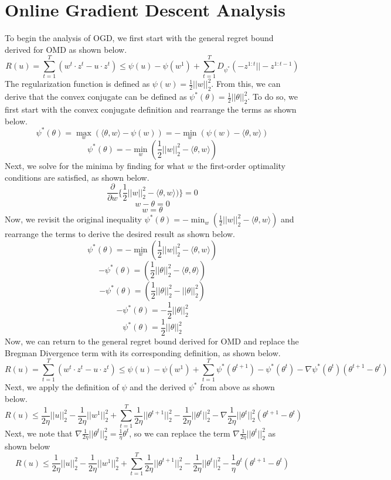 \documentclass[11pt]{article}
\begin{document}
\section{Online Gradient Descent Analysis}
To begin the analysis of OGD, we first start with the general regret bound derived for OMD as shown below.
\[ R(u) = \sum_{t=1}^T (w^t \cdot z^t - u \cdot z^t) \leq \psi(u) - \psi(w^1) + \sum_{t=1}^T D_{\psi^*}(-z^{1:t}||-z^{1:t-1}) \]
The regularization function is defined as $\psi(w) = \frac{1}{2}||w||_2^2$. From this, we can derive that the convex conjugate can be defined as $\psi^*(\theta) = \frac{1}{2}||\theta||_2^2$. To do so, we first start with the convex conjugate definition and rearrange the terms as shown below.
\[ \psi^*(\theta) = \max_w (\langle \theta, w \rangle - \psi(w)) = -\min_w (\psi(w) - \langle \theta, w \rangle) \]
\[ \psi^*(\theta) = -\min_w (\frac{1}{2}||w||_2^2 - \langle \theta, w \rangle) \]
Next, we solve for the minima by finding for what $w$ the first-order optimality conditions are satisfied, as shown below.
\[ \frac{\partial}{\partial w}\{ \frac{1}{2}||w||_2^2 - \langle \theta, w \rangle) \} = 0 \]
\[ w - \theta = 0 \]
\[ w = \theta \]
Now, we revisit the original inequality $\psi^*(\theta) = -\min_w (\frac{1}{2}||w||_2^2 - \langle \theta, w \rangle)$ and rearrange the terms to derive the desired result as shown below.
\[ \psi^*(\theta) = -\min_w (\frac{1}{2}||w||_2^2 - \langle \theta, w \rangle) \]
\[ -\psi^*(\theta) = (\frac{1}{2}||\theta||_2^2 - \langle \theta, \theta \rangle) \]
\[ -\psi^*(\theta) = (\frac{1}{2}||\theta||_2^2 - ||\theta||_2^2) \]
\[ -\psi^*(\theta) = -\frac{1}{2}||\theta||_2^2 \]
\[ \psi^*(\theta) = \frac{1}{2}||\theta||_2^2 \]
Now, we can return to the general regret bound derived for OMD and replace the Bregman Divergence term with its corresponding definition, as shown below.
\[ R(u) = \sum_{t=1}^T (w^t \cdot z^t - u \cdot z^t) \leq \psi(u) - \psi(w^1) + \sum_{t=1}^T \psi^*(\theta^{t+1}) - \psi^*(\theta^t) - \nabla \psi^*(\theta^t)(\theta^{t+1}-\theta^t) \]
Next, we apply the definition of $\psi$ and the derived $\psi^*$ from above as shown below.
\[ R(u) \leq \frac{1}{2\eta}||u||_2^2 -  \frac{1}{2\eta}||w^1||_2^2 + \sum_{t=1}^T \frac{1}{2\eta}||\theta^{t+1}||_2^2 - \frac{1}{2\eta}||\theta^t||_2^2 - \nabla \frac{1}{2\eta}||\theta^t||_2^2(\theta^{t+1}-\theta^t) \]
Next, we note that $\nabla \frac{1}{2\eta}||\theta^t||_2^2 = \frac{1}{\eta}\theta^t$, so we can replace the term $\nabla \frac{1}{2\eta}||\theta^t||_2^2$ as shown below
\[ R(u) \leq \frac{1}{2\eta}||u||_2^2 -  \frac{1}{2\eta}||w^1||_2^2 + \sum_{t=1}^T \frac{1}{2\eta}||\theta^{t+1}||_2^2 - \frac{1}{2\eta}||\theta^t||_2^2 - \frac{1}{\eta}\theta^t(\theta^{t+1}-\theta^t) \]
\end{document}
